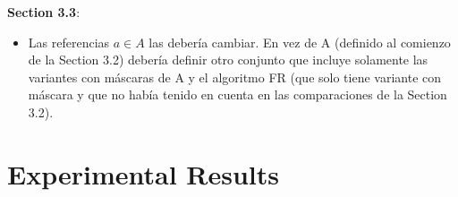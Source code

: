 \vspace{+5pt}
\textbf{Section 3.3}:
\vspace{-10pt}
\begin{itemize}
    \item Las referencias $a \in A$ las debería cambiar. En vez de A (definido al comienzo de la Section 3.2) debería definir otro conjunto que incluye solamente las variantes con máscaras de A y el algoritmo FR (que solo tiene variante con máscara y que no había tenido en cuenta en las comparaciones de la Section 3.2).
\end{itemize}



\chapter{Experimental Results} %

\label{experiments} %


\newcommand{\maskalgo}{\textit{M}}
\newcommand{\NOmaskalgo}{\textit{NM}}
\newcommand{\coder}{\textit{c}}
\newcommand{\difrelativa}{\textit{RD}}
\newcommand{\tasacompresion}{\textit{CR}}
\newcommand{\nmbits}{\NOmaskalgo_{\textit{S}}}
\newcommand{\mbits}{\maskalgo_\textit{S}}
\newcommand{\cmaskalgo}{$c_\maskalgo$}
\newcommand{\cNOmaskalgo}{$c_\NOmaskalgo$}
\newcommand{\ca}{\textit{CI}}
\newcommand{\algo}{\textit{c}}







